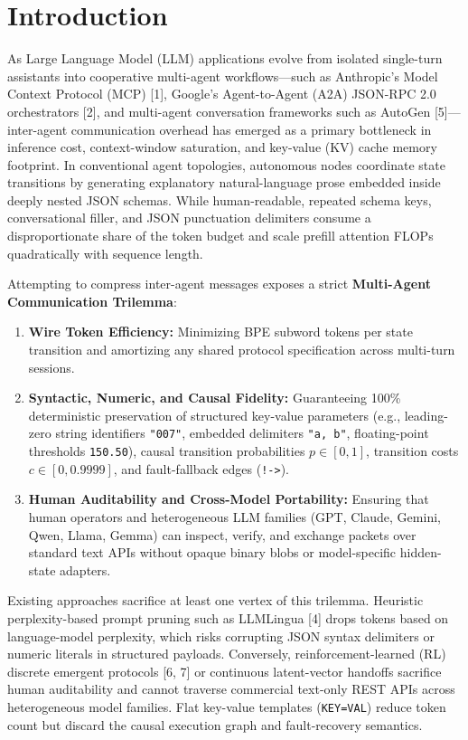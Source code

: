 \documentclass[9pt,a4paper]{extarticle}
\begin{document}
{\begin{minipage}{\dimexpr\textwidth-2\fboxsep-2\fboxrule\relax}
{}
\vspace{1.5pt}
\end{minipage}%
}

\section{Introduction}
As Large Language Model (LLM) applications evolve from isolated single-turn assistants into cooperative multi-agent workflows---such as Anthropic's Model Context Protocol (MCP) [1], Google's Agent-to-Agent (A2A) JSON-RPC 2.0 orchestrators [2], and multi-agent conversation frameworks such as AutoGen [5]---inter-agent communication overhead has emerged as a primary bottleneck in inference cost, context-window saturation, and key-value (KV) cache memory footprint. In conventional agent topologies, autonomous nodes coordinate state transitions by generating explanatory natural-language prose embedded inside deeply nested JSON schemas. While human-readable, repeated schema keys, conversational filler, and JSON punctuation delimiters consume a disproportionate share of the token budget and scale prefill attention FLOPs quadratically with sequence length.

Attempting to compress inter-agent messages exposes a strict \textbf{Multi-Agent Communication Trilemma}:
\begin{enumerate}
  \item \textbf{Wire Token Efficiency:} Minimizing BPE subword tokens per state transition and amortizing any shared protocol specification across multi-turn sessions.
  \item \textbf{Syntactic, Numeric, and Causal Fidelity:} Guaranteeing 100\% deterministic preservation of structured key-value parameters (e.g., leading-zero string identifiers \texttt{"007"}, embedded delimiters \texttt{"a, b"}, floating-point thresholds \texttt{150.50}), causal transition probabilities $p \in [0,1]$, transition costs $c \in [0, 0.9999]$, and fault-fallback edges (\texttt{!->}).
  \item \textbf{Human Auditability and Cross-Model Portability:} Ensuring that human operators and heterogeneous LLM families (GPT, Claude, Gemini, Qwen, Llama, Gemma) can inspect, verify, and exchange packets over standard text APIs without opaque binary blobs or model-specific hidden-state adapters.
\end{enumerate}

Existing approaches sacrifice at least one vertex of this trilemma. Heuristic perplexity-based prompt pruning such as LLMLingua [4] drops tokens based on language-model perplexity, which risks corrupting JSON syntax delimiters or numeric literals in structured payloads. Conversely, reinforcement-learned (RL) discrete emergent protocols [6, 7] or continuous latent-vector handoffs sacrifice human auditability and cannot traverse commercial text-only REST APIs across heterogeneous model families. Flat key-value templates (\texttt{KEY=VAL}) reduce token count but discard the causal execution graph and fault-recovery semantics.
\end{document}
